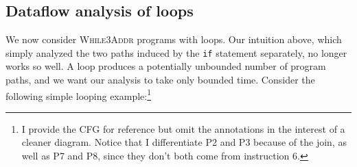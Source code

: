 \documentclass[11pt]{article}
\begin{document}
\subsection{Dataflow analysis of loops}

We now consider \textsc{While3Addr} programs with loops. Our intuition above,
which simply analyzed the two paths induced by the \texttt{if} statement
separately, no longer works so well.  A loop produces a potentially unbounded
number of program paths, and we want our analysis to take only bounded
time. Consider the following simple
looping example:\footnote{I provide the CFG for reference but omit the
  annotations in the interest of a cleaner diagram.  Notice that I differentiate
  P2 and P3 because of the join, as well as P7 and P8,
  since they don't both come from instruction 6.}
\end{document}
